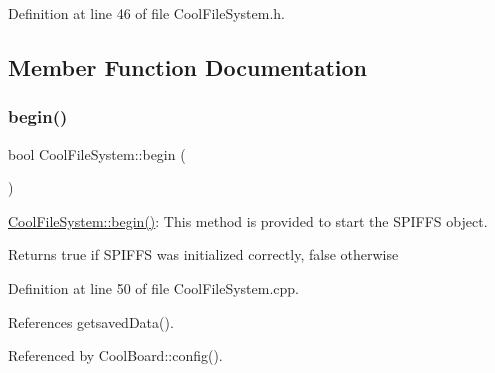 Definition at line 46 of file Cool\+File\+System.\+h.



\subsection{Member Function Documentation}
\mbox{\label{class_cool_file_system_a6ba6f666ed4c530174f8569d2c636748}} 
\subsubsection{\texorpdfstring{begin()}{begin()}}
{\footnotesize\ttfamily bool Cool\+File\+System\+::begin (\begin{DoxyParamCaption}{ }\end{DoxyParamCaption})}

\hyperlink{class_cool_file_system_a6ba6f666ed4c530174f8569d2c636748}{Cool\+File\+System\+::begin()}\+: This method is provided to start the S\+P\+I\+F\+FS object.

\begin{DoxyReturn}{Returns}
true if S\+P\+I\+F\+FS was initialized correctly, false otherwise 
\end{DoxyReturn}


Definition at line 50 of file Cool\+File\+System.\+cpp.



References getsaved\+Data().



Referenced by Cool\+Board\+::config().

